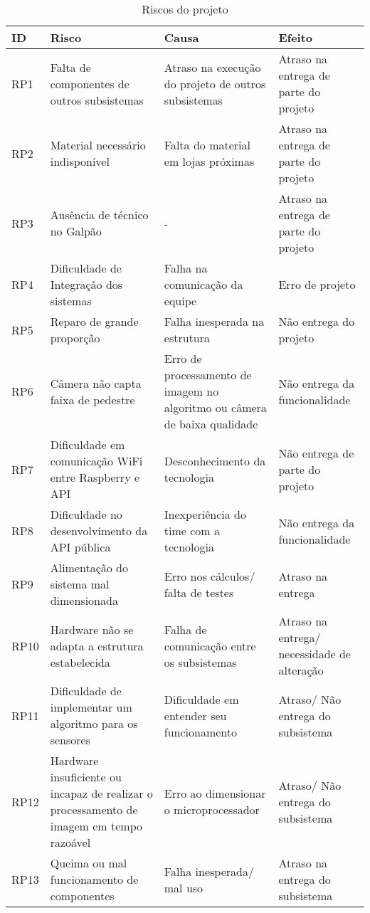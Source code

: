 \begin{table}[h]
    \centering
    \caption{Riscos do projeto} \label{riscos}
    \begin{tabular}{p{0.5in}p{1.5in}p{1.5in}p{1.5in}}
    
    ID & Risco & Causa & Efeito\\ \hline
    RP1 & Falta de componentes de outros subsistemas & Atraso na execução do projeto de outros subsistemas & Atraso na entrega de parte do projeto \\ \hline
    RP2 & Material necessário indisponível & Falta do material em lojas próximas & Atraso na entrega de parte do projeto \\ \hline
    RP3 & Ausência de técnico no Galpão & - & Atraso na entrega de parte do projeto \\ \hline
    RP4 & Dificuldade de Integração dos sistemas & Falha na comunicação da equipe & Erro de projeto \\ \hline
    RP5 & Reparo de grande proporção & Falha inesperada na estrutura & Não entrega do projeto \\ \hline
    RP6 & Câmera não capta faixa de pedestre & Erro de processamento de imagem no algoritmo ou câmera de baixa qualidade & Não entrega da funcionalidade \\ \hline
    RP7 & Dificuldade em comunicação WiFi entre Raspberry e API & Desconhecimento da tecnologia & Não entrega de parte do projeto \\ \hline
    RP8 & Dificuldade no desenvolvimento da API pública & Inexperiência do time com a tecnologia & Não entrega da funcionalidade \\ \hline
    RP9& Alimentação do sistema mal dimensionada & Erro nos cálculos/ falta de testes & Atraso na entrega \\ \hline
    RP10 & Hardware não se adapta a estrutura estabelecida & Falha de comunicação entre os subsistemas & Atraso na entrega/ necessidade de alteração \\ \hline
    RP11 & Dificuldade de implementar um algoritmo para os sensores & Dificuldade em entender seu funcionamento & Atraso/ Não entrega do subsistema \\ \hline
    RP12 & Hardware insuficiente ou incapaz de realizar o processamento de imagem em tempo razoável & Erro ao dimensionar o microprocessador & Atraso/ Não entrega do subsistema \\ \hline 
    RP13 & Queima ou mal funcionamento de componentes & Falha inesperada/ mal uso & Atraso na entrega do subsistema \\ \hline
    \end{tabular}
\end{table}

